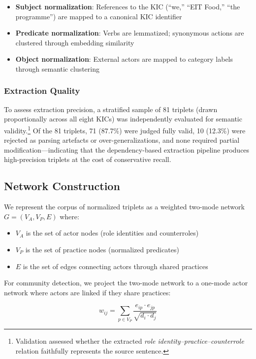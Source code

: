 \documentclass[../main.tex]{subfiles}
\begin{document}
\begin{itemize}
    \item \textbf{Subject normalization}: References to the KIC (``we,'' ``EIT Food,'' ``the programme'') are mapped to a canonical KIC identifier
    \item \textbf{Predicate normalization}: Verbs are lemmatized; synonymous actions are clustered through embedding similarity
    \item \textbf{Object normalization}: External actors are mapped to category labels through semantic clustering
\end{itemize}

\subsubsection{Extraction Quality}

To assess extraction precision, a stratified sample of 81 triplets
(drawn proportionally across all eight KICs) was independently evaluated
for semantic validity.\footnote{Validation assessed whether the extracted
\emph{role identity--practice--counterrole} relation faithfully represents
the source sentence.}
Of the 81 triplets, 71 (87.7\%) were judged fully valid,
10 (12.3\%) were rejected as parsing artefacts or over-generalizations,
and none required partial modification---indicating that
the dependency-based extraction pipeline produces high-precision triplets
at the cost of conservative recall.

\subsection{Network Construction}

We represent the corpus of normalized triplets as a weighted two-mode network $G = (V_A, V_P, E)$ where:

\begin{itemize}
    \item $V_A$ is the set of actor nodes (role identities and counterroles)
    \item $V_P$ is the set of practice nodes (normalized predicates)
    \item $E$ is the set of edges connecting actors through shared practices
\end{itemize}

For community detection, we project the two-mode network to a one-mode actor network where actors are linked if they share practices:

\begin{equation}
    w_{ij} = \sum_{p \in V_P} \frac{e_{ip} \cdot e_{jp}}{\sqrt{d_i \cdot d_j}}
\end{equation}
\end{document}

